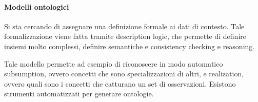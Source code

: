 \paragraph{Modelli ontologici}
Si sta cercando di assegnare una definizione formale ai dati di contesto.
Tale formalizzazione viene fatta tramite description logic, 
che permette di definire insiemi molto complessi, definire semantiche 
e consistency checking e reasoning.

Tale modello permette ad esempio di riconoscere in modo automatico 
subsumption, ovvero concetti che sono specializzazioni di altri, 
e realization, ovvero quali sono i concetti che catturano 
un set di osservazioni.
Esistono strumenti automatizzati per generare ontologie.





